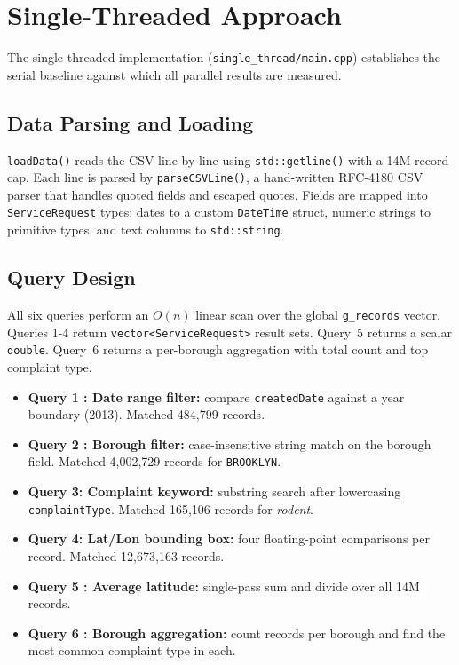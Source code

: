 \documentclass[12pt]{article}
\begin{document}
\section{Single-Threaded Approach}
\label{sec:single}

The single-threaded implementation (\texttt{single\_thread/main.cpp})
establishes the serial baseline against which all parallel results are measured.

\subsection{Data Parsing and Loading}

\texttt{loadData()} reads the CSV line-by-line using \texttt{std::getline()}
with a 14M record cap. Each line is parsed by \texttt{parseCSVLine()}, a
hand-written RFC-4180 CSV parser that handles quoted fields and escaped quotes.
Fields are mapped into \texttt{ServiceRequest} types: dates to a custom
\texttt{DateTime} struct, numeric strings to primitive types, and text columns
to \texttt{std::string}.

\subsection{Query Design}

All six queries perform an $O(n)$ linear scan over the global
\texttt{g\_records} vector. Queries 1-4 return \texttt{vector<ServiceRequest>}
result sets. Query~5 returns a scalar \texttt{double}. Query~6 returns a
per-borough aggregation with total count and top complaint type.

\begin{itemize}
  \item \textbf{Query 1 : Date range filter:} compare \texttt{createdDate}
    against a year boundary (2013). Matched 484,799 records.
  \item \textbf{Query 2 : Borough filter:} case-insensitive string match on
    the borough field. Matched 4,002,729 records for \texttt{BROOKLYN}.
  \item \textbf{Query 3: Complaint keyword:} substring search after
    lowercasing \texttt{complaintType}. Matched 165,106 records for
    \textit{rodent}.
  \item \textbf{Query 4: Lat/Lon bounding box:} four floating-point
    comparisons per record. Matched 12,673,163 records.
  \item \textbf{Query 5 : Average latitude:} single-pass sum and divide
    over all 14M records.
  \item \textbf{Query 6 : Borough aggregation:} count records per borough
    and find the most common complaint type in each.
\end{itemize}
\end{document}
